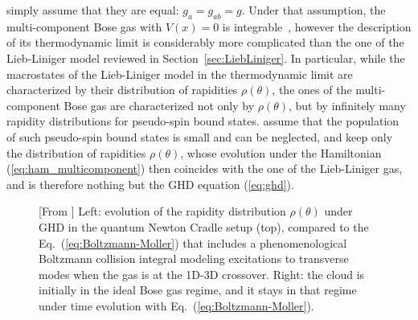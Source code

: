 \documentclass[onecolumn,amsfonts,showpacs,superscriptaddress]{revtex4-1}
\begin{document}
\cite{moller_extension_2021} simply assume that they are equal: $g_a = g_{ab} = g$. Under that assumption, the multi-component Bose gas with $V(x)=0$ is integrable~\citep{yang1967some,gaudin2014bethe,caux2009polarization,klauser2011equilibrium,klumper2011efficient,pactu2015thermodynamics,robinson2016exact,robinson2017excitations}, however the description of  its thermodynamic limit is considerably more complicated than the one of the Lieb-Liniger model reviewed in Section~\ref{sec:LiebLiniger}. In particular, while the macrostates of the Lieb-Liniger model in the thermodynamic limit are characterized by their distribution of rapidities $\rho(\theta)$, the ones of the multi-component Bose gas are characterized not only by $\rho(\theta)$, but by infinitely many rapidity distributions for pseudo-spin bound states. \cite{moller_extension_2021} assume that the population of such pseudo-spin bound states is small and can be neglected, and keep only the distribution of rapidities $\rho(\theta)$, whose evolution under the Hamiltonian (\ref{eq:ham_multicomponent}) then coincides with the one of the Lieb-Liniger gas, and is therefore nothing but the GHD equation (\ref{eq:ghd}).

\begin{figure}[tb]
    \centering
    \caption{ [From \citep{moller_extension_2021}] Left: evolution of the rapidity distribution $\rho(\theta)$ under GHD in the quantum Newton Cradle setup (top), compared to the Eq.~(\ref{eq:Boltzmann-Moller}) that includes a phenomenological Boltzmann collision integral modeling excitations to transverse modes when the gas is at the 1D-3D crossover. Right: the cloud is initially in the ideal Bose gas regime, and it stays in that regime under time evolution with Eq.~(\ref{eq:Boltzmann-Moller}).}
    \label{fig:newton_cradle_Dcrossover}
\end{figure}
\end{document}
